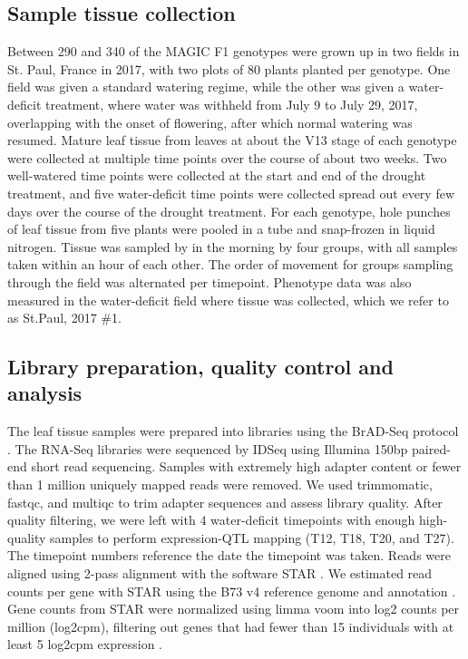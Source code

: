 \documentclass[article,9pt,twocolumn,twoside]{rilabRxiv}
\begin{document}
\subsection{Sample tissue collection}
Between 290 and 340 of the MAGIC F1 genotypes were grown up in two fields in St. Paul, France in 2017, with two plots of 80 plants planted per genotype.
One field was given a standard watering regime, while the other was given a water-deficit treatment, where water was withheld from July 9 to July 29, 2017, overlapping with the onset of flowering, after which normal watering was resumed. 
Mature leaf tissue from leaves at about the V13 stage of each genotype were collected at multiple time points over the course of about two weeks.
Two well-watered time points were collected at the start and end of the drought treatment, and five water-deficit time points were collected spread out every few days over the course of the drought treatment.
For each genotype, hole punches of leaf tissue from five plants were pooled in a tube and snap-frozen in liquid nitrogen.
Tissue was sampled by in the morning by four groups, with all samples taken within an hour of each other.
The order of movement for groups sampling through the field was alternated per timepoint. 
Phenotype data was also measured in the water-deficit field where tissue was collected, which we refer to as St.Paul, 2017 \#1.
\subsection{Library preparation, quality control and analysis}
The leaf tissue samples were prepared into libraries using the BrAD-Seq protocol \citep{Townsley}. 
The RNA-Seq libraries were sequenced by IDSeq using Illumina 150bp paired-end short read sequencing.
Samples with extremely high adapter content or fewer than 1 million uniquely mapped reads were removed. 
We used trimmomatic, fastqc, and multiqc \citep{Bolger,Andrews,Ewels} to trim adapter sequences and assess library quality.
After quality filtering, we were left with 4 water-deficit timepoints with enough high-quality samples to perform expression-QTL mapping (T12, T18, T20, and T27).
The timepoint numbers reference the date the timepoint was taken.
Reads were aligned using 2-pass alignment with the software STAR \citep{Dobin}.
We estimated read counts per gene with STAR using the B73 v4 reference genome and annotation \citep{Jiao} .
Gene counts from STAR were normalized using limma voom into log2 counts per million (log2cpm), filtering out genes that had fewer than 15 individuals with at least 5 log2cpm expression \citep{Law}.
\end{document}
